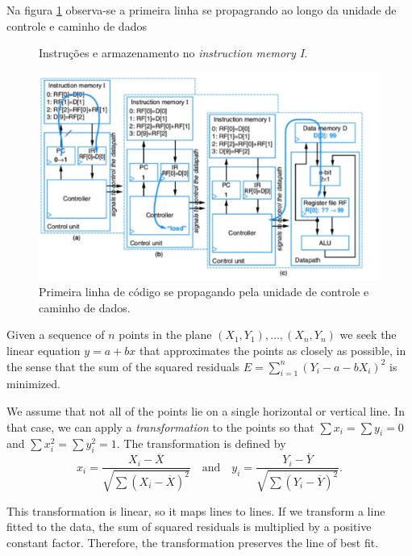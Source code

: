 \documentclass{article}
\begin{document}
Na figura \ref{fig:unidadeControleExemplo} observa-se a primeira linha se propagrando ao longo da unidade de controle e caminho de dados


\begin{figure}[h]
\centering
\begin{minipage}{0.48\textwidth}
     \centering
     \def\svgwidth{0.4\textwidth}
     
     \caption{\label{fig:fdx3} Instruções e armazenamento no \textit{instruction memory I}.}
     \hfill
\end{minipage}\hfill
\begin{minipage}{0.48\textwidth}
    \centering 
    \includegraphics[width=1\textwidth]{unidadeControle.jpg} 
    \caption{Primeira linha de código se propagando pela unidade de controle e caminho de dados.} 
    \label{fig:unidadeControleExemplo} 
\end{minipage}
\end{figure}

\iffalse
Given a sequence of $n$ points in the plane $(X_1, Y_1), \ldots, (X_n, Y_n)$
we seek the linear equation $y = a + bx$ that approximates the points
as closely as possible, in the sense that the sum of the squared residuals
$E = \sum_{i=1}^n (Y_i - a - bX_i)^2$ is minimized.

We assume that not all of the points lie on a single horizontal or vertical
line. In that case, we can apply a \emph{transformation} to the points
so that $\sum x_i = \sum y_i = 0$ and $\sum x_i^2 = \sum y_i^2 = 1$.
The transformation is defined by
$$
x_i = \frac{X_i - \overline{X}}{\sqrt{\sum (X_i - \overline{X})^2}}\quad\text{and}\quad
y_i = \frac{Y_i - \overline{Y}}{\sqrt{\sum (Y_i - \overline{Y})^2}}.
$$

This transformation is linear, so it maps lines to lines.
If we transform a line fitted to the data,
the sum of squared residuals is multiplied by a positive constant factor.
Therefore, the transformation preserves the line of best fit.
\end{document}
